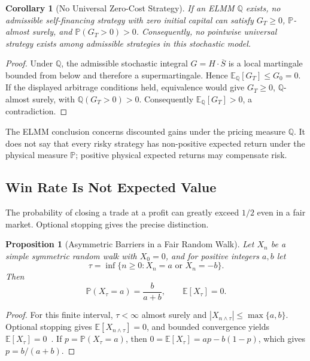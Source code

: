 \documentclass[aps,pra,reprint,superscriptaddress,amsmath,amssymb,floatfix]{revtex4-2}
\theoremstyle{plain}
\newtheorem{corollary}[theorem]{Corollary}
\newtheorem{proposition}[theorem]{Proposition}
\theoremstyle{definition}
\theoremstyle{remark}
\begin{document}
\begin{corollary}[No Universal Zero-Cost Strategy]
  \label{cor:noarb}
  If an ELMM \(\mathbb{Q}\) exists, no admissible self-financing strategy with
  zero initial capital can satisfy
  \(G_T\geq0\), \(\mathbb{P}\)-almost surely, and
  \(\mathbb{P}(G_T>0)>0\). Consequently, no pointwise universal strategy
  exists among admissible strategies in this stochastic model.
\end{corollary}

\begin{proof}
Under \(\mathbb{Q}\), the admissible stochastic integral
\(G=H\mathbin{\cdot}\overline S\) is a local martingale bounded from below and
therefore a supermartingale. Hence
\(\mathbb{E}_{\mathbb{Q}}[G_T]\leq G_0=0\). If the displayed arbitrage
conditions held, equivalence would give \(G_T\geq0\),
\(\mathbb{Q}\)-almost surely, with
\(\mathbb{Q}(G_T>0)>0\). Consequently
\(\mathbb{E}_{\mathbb{Q}}[G_T]>0\), a contradiction.
\end{proof}

The ELMM conclusion concerns discounted gains under the pricing measure
\(\mathbb{Q}\). It does not say that every risky strategy has non-positive
expected return under the physical measure \(\mathbb{P}\); positive physical
expected returns may compensate risk.

\subsection{Win Rate Is Not Expected Value}

The probability of closing a trade at a profit can greatly exceed \(1/2\)
even in a fair market. Optional stopping gives the precise distinction.

\begin{proposition}[Asymmetric Barriers in a Fair Random Walk]
  \label{prop:optional}
  Let \(X_n\) be a simple symmetric random walk with \(X_0=0\), and for positive
  integers \(a,b\) let
  \[
    \tau=\inf\{n\geq0:X_n=a\text{ or }X_n=-b\}.
  \]
  Then
  \begin{equation}
    \mathbb{P}(X_\tau=a)=\frac{b}{a+b},
    \qquad
    \mathbb{E}[X_\tau]=0.
    \label{eq:gambler}
  \end{equation}
\end{proposition}

\begin{proof}
For this finite interval, \(\tau<\infty\) almost surely and
\(|X_{n\wedge\tau}|\leq\max\{a,b\}\). Optional stopping gives
\(\mathbb E[X_{n\wedge\tau}]=0\), and bounded convergence yields
\(\mathbb E[X_\tau]=0\)~\cite{Doob1953}. If
\(p=\mathbb{P}(X_\tau=a)\), then
\(0=\mathbb{E}[X_\tau]=ap-b(1-p)\), which gives
\(p=b/(a+b)\).
\end{proof}
\end{document}
